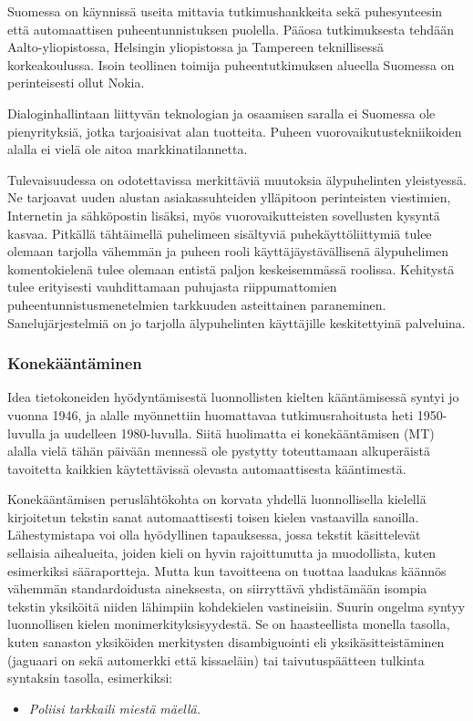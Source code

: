 \documentclass[]{../../metanetpaper}
\begin{document}
\begin{multicols}{2}
Suomessa on käynnissä useita mittavia tutkimushankkeita sekä
puhesynteesin että automaattisen puheentunnistuksen puolella. Pääosa
tutkimuksesta tehdään Aalto-yliopistossa, Helsingin yliopistossa ja
Tampereen teknillisessä korkeakoulussa. Isoin teollinen toimija
puheentutkimuksen alueella Suomessa on perinteisesti ollut Nokia.

Dialoginhallintaan liittyvän teknologian ja osaamisen saralla ei
Suomessa ole pienyrityksiä, jotka tarjoaisivat alan tuotteita. Puheen
vuorovaikutustekniikoiden alalla ei vielä ole aitoa markkinatilannetta.

Tulevaisuudessa on odotettavissa merkittäviä muutoksia älypuhelinten
yleistyessä. Ne tarjoavat uuden alustan asiakassuhteiden
ylläpitoon perinteisten viestimien, Internetin ja sähköpostin
lisäksi, myös vuorovaikutteisten sovellusten kysyntä kasvaa. Pitkällä tähtäimellä
puhelimeen sisältyviä puhekäyttöliittymiä tulee olemaan tarjolla
vähemmän ja puheen rooli käyttäjäystävällisenä älypuhelimen
komentokielenä tulee olemaan entistä paljon keskeisemmässä
roolissa. Kehitystä tulee erityisesti vauhdittamaan puhujasta
riippumattomien puheentunnistusmenetelmien tarkkuuden asteittainen
paraneminen.  Sanelujärjestelmiä on jo tarjolla älypuhelinten
käyttäjille keskitettyinä palveluina.


\subsubsection{Konekääntäminen}



Idea tietokoneiden hyödyntämisestä luonnollisten kielten
kääntämisessä syntyi jo vuonna 1946, ja alalle myönnettiin huomattavaa
tutkimusrahoitusta heti 1950-luvulla ja uudelleen 1980-luvulla. Siitä
huolimatta ei konekääntämisen (MT) alalla vielä tähän päivään mennessä
ole pystytty toteuttamaan alkuperäistä tavoitetta kaikkien
käytettävissä olevasta automaattisesta kääntimestä.

Konekääntämisen peruslähtökohta on korvata yhdellä luonnollisella
kielellä kirjoitetun tekstin sanat automaattisesti toisen kielen
vastaavilla sanoilla.  Lähestymistapa voi olla hyödyllinen
tapauksessa, jossa tekstit käsittelevät sellaisia aihealueita, joiden
kieli on hyvin rajoittunutta ja muodollista, kuten esimerkiksi
sääraportteja. Mutta kun tavoitteena on tuottaa laadukas käännös
vähemmän standardoidusta aineksesta, on siirryttävä yhdistämään
isompia tekstin yksiköitä niiden lähimpiin kohdekielen
vastineisiin. Suurin ongelma syntyy luonnollisen kielen
monimerkityksisyydestä. Se on haasteellista monella tasolla, kuten
sanaston yksiköiden merkitysten disambiguointi eli
yksikäsitteistäminen (jaguaari on sekä automerkki että kissaeläin) tai
taivutuspäätteen tulkinta syntaksin tasolla, esimerkiksi:
\begin{itemize}
\item[] \textit{Poliisi tarkkaili miestä mäellä.}


\end{itemize}
\end{multicols}
\end{document}
